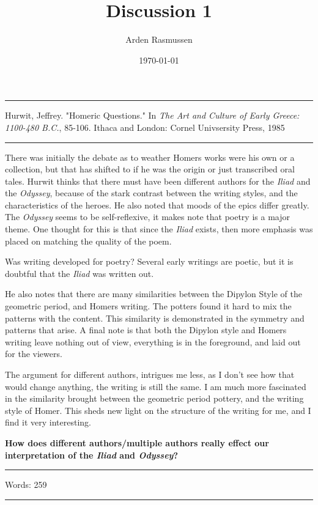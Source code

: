 \documentclass[12pt]{amsart}
\title{Discussion 1}
\author{Arden Rasmussen}
\date{\today}
\begin{document}
\maketitle

\par\noindent\rule{\textwidth}{0.4pt}

\begin{hangparas}{.25in}{1}
  Hurwit, Jeffrey. "Homeric Questions." In \textit{The Art and Culture of Early
  Greece: 1100-480 B.C.}, 85-106. Ithaca and London: Cornel Univsersity Press,
  1985
\end{hangparas}

\par\noindent\rule{\textwidth}{0.4pt}

There was initially the debate as to weather Homers works were his own or a
collection, but that has shifted to if he was the origin or just transcribed
oral tales. Hurwit thinks that there must have been different authors for the
\textit{Iliad} and the \textit{Odyssey}, because of the stark contrast between
the writing styles, and the characteristics of the heroes. He also noted that
moods of the epics differ greatly.  The \textit{Odyssey} seems to be
self-reflexive, it makes note that poetry is a major theme. One thought for
this is that since the \textit{Iliad} exists, then more emphasis was placed on
matching the quality of the poem.

Was writing developed for poetry? Several early writings are poetic, but it is
doubtful that the \textit{Iliad} was written out.

He also notes that there are many similarities between the Dipylon Style of the
geometric period, and Homers writing. The potters found it hard to mix the
patterns with the content.  This similarity is demonstrated in the symmetry and
patterns that arise. A final note is that both the Dipylon style and Homers
writing leave nothing out of view, everything is in the foreground, and laid
out for the viewers.

The argument for different authors, intrigues me less, as I don't see how that
would change anything, the writing is still the same. I am much more fascinated
in the similarity brought between the geometric period pottery, and the
writing style of Homer. This sheds new light on the structure of the writing
for me, and I find it very interesting.

\textbf{How does different authors/multiple authors really effect our
interpretation of the \textit{Iliad} and \textit{Odyssey}?  }

\par\noindent\rule{\textwidth}{0.4pt}

Words: 259

\par\noindent\rule{\textwidth}{0.4pt}
\end{document}
